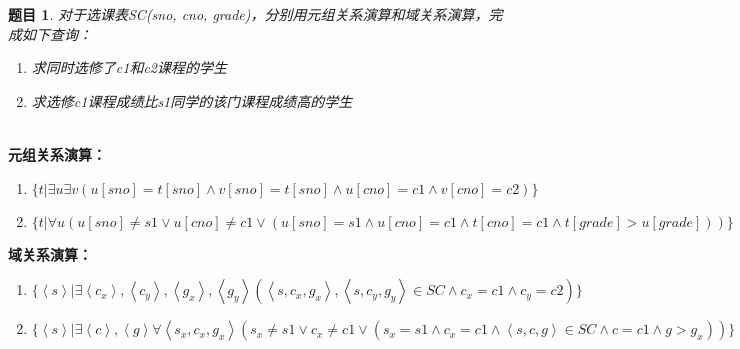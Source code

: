 \documentclass[12pt]{article} %
\theoremstyle{problemstyle} %
\newtheorem{problem}{题目} %
\newenvironment{solution}
  {%
    \renewcommand\qedsymbol{$\blacksquare$}%
    \proof[\textit{解答}]\mbox{}\vspace{-4ex}\\%
  }
  {\endproof}
\begin{document}
\begin{problem}
对于选课表SC(sno, cno, grade)，分别用元组关系演算和域关系演算，完成如下查询：

\begin{enumerate}
  \item 求同时选修了c1和c2课程的学生
  \item 求选修c1课程成绩比s1同学的该门课程成绩高的学生
\end{enumerate}  
  
\end{problem}

\begin{solution}

\textbf{元组关系演算：}

\begin{enumerate}
  \item 
  \[
    \{t|\exists u\exists v(u[sno]=t[sno]\wedge v[sno]=t[sno]\wedge u[cno]=c1\wedge v[cno]=c2)\}
  \]
  \item 
  \[
    \{t|\forall u(u[sno]\neq s1\vee u[cno]\neq c1\vee (u[sno]=s1\wedge u[cno]=c1\wedge t[cno]=c1\wedge t[grade]>u[grade]))\}
  \]
\end{enumerate}

\textbf{域关系演算：}

\begin{enumerate}
  \item 
  \[
    \{\left< s\right> |\exists\left< c_x\right> ,\left< c_y\right> ,\left< g_x\right> ,\left< g_y\right> (\left< s,c_x,g_x\right> ,\left< s,c_y,g_y\right> \in SC\wedge c_x=c1\wedge c_y=c2)\}
  \]
  \item 
  \[
    \{\left< s\right> |\exists\left<  c\right>  ,\left< g\right> \forall\left< s_x,c_x,g_x\right> (s_x\neq s1\vee c_x\neq c1\vee(s_x=s1\wedge c_x=c1\wedge\left< s,c,g\right> \in SC\wedge c=c1\wedge g> g_x))\}
  \]
\end{enumerate}

\end{solution}

\newpage


\end{document}
